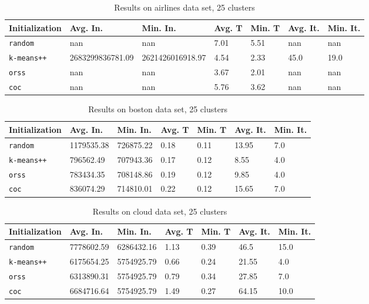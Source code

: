 \begin{table}[h]
	\begin{center}
		\begin{tabular}{|l|l|l|l|l|l|l|}
			\hline
			Initialization & Avg. In. & Min. In. & Avg. T & Min. T & Avg. It. & Min. It.\\\hline
			\texttt{random} & nan & nan & 7.01 & 5.51 & nan & nan\\\hline
			\texttt{k-means++} & 2683299836781.09 & 2621426016918.97 & 4.54 & 2.33 & 45.0 & 19.0\\\hline
			\texttt{orss} & nan & nan & 3.67 & 2.01 & nan & nan\\\hline
			\texttt{coc} & nan & nan & 5.76 & 3.62 & nan & nan\\\hline
		\end{tabular}
		\caption{Results on airlines data set, 25 clusters}
		\label{tbl:airlines25}
	\end{center}
\end{table}

\begin{table}[h]
	\begin{center}
		\begin{tabular}{|l|l|l|l|l|l|l|}
			\hline
			Initialization & Avg. In. & Min. In. & Avg. T & Min. T & Avg. It. & Min. It.\\\hline
			\texttt{random} & 1179535.38 & 726875.22 & 0.18 & 0.11 & 13.95 & 7.0\\\hline
			\texttt{k-means++} & 796562.49 & 707943.36 & 0.17 & 0.12 & 8.55 & 4.0\\\hline
			\texttt{orss} & 783434.35 & 708148.86 & 0.19 & 0.12 & 9.85 & 4.0\\\hline
			\texttt{coc} & 836074.29 & 714810.01 & 0.22 & 0.12 & 15.65 & 7.0\\\hline
		\end{tabular}
		\caption{Results on boston data set, 25 clusters}
		\label{tbl:boston25}
	\end{center}
\end{table}

\begin{table}[h]
	\begin{center}
		\begin{tabular}{|l|l|l|l|l|l|l|}
			\hline
			Initialization & Avg. In. & Min. In. & Avg. T & Min. T & Avg. It. & Min. It.\\\hline
			\texttt{random} & 7778602.59 & 6286432.16 & 1.13 & 0.39 & 46.5 & 15.0\\\hline
			\texttt{k-means++} & 6175654.25 & 5754925.79 & 0.66 & 0.24 & 21.55 & 4.0\\\hline
			\texttt{orss} & 6313890.31 & 5754925.79 & 0.79 & 0.34 & 27.85 & 7.0\\\hline
			\texttt{coc} & 6684716.64 & 5754925.79 & 1.49 & 0.27 & 64.15 & 10.0\\\hline
		\end{tabular}
		\caption{Results on cloud data set, 25 clusters}
		\label{tbl:cloud25}
	\end{center}
\end{table}

